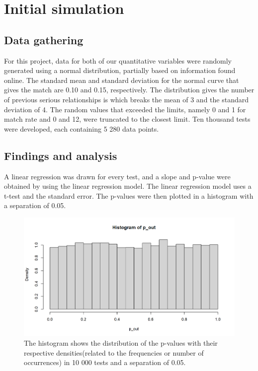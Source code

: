 \documentclass[12pt]{article}
\begin{document}
\section{Initial simulation}
\subsection{Data gathering}
    For this project, data for both of our quantitative variables were randomly generated using a normal distribution, partially based on information found online. The standard mean and standard deviation for the normal curve that gives the match are 0.10\cite{elad2024} and 0.15, respectively. The distribution gives the number of previous serious relationships is which breaks the mean of 3 and the standard deviation of 4. The random values that exceeded the limits, namely 0 and 1 for match rate and 0 and 12, were truncated to the closest limit. Ten thousand tests were developed, each containing 5 280 data points. 

\subsection{Findings and analysis}
    A linear regression was drawn for every test, and a slope and p-value were obtained by using the linear regression model. The linear regression model uses a t-test and the standard error. The p-values were then plotted in a histogram with a separation of 0.05.

    \begin{figure}[H]
        \centering
        \includegraphics[width=1\linewidth]{figures/R_plotB.png}
        \caption{The histogram shows the distribution of the p-values with their respective densities(related to the frequencies or number of occurrences) in 10 000 tests and a separation of 0.05.}
        \label{fig:enter-label}
    \end{figure}
\end{document}
